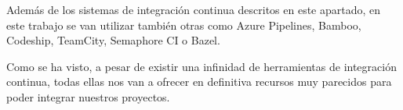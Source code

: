 

Además de los sistemas de integración continua descritos en este apartado, en este trabajo se van utilizar también otras como Azure Pipelines, Bamboo, Codeship, TeamCity, Semaphore CI o Bazel.

Como se ha visto, a pesar de existir una infinidad de herramientas de integración continua, todas ellas nos van a ofrecer en definitiva recursos muy parecidos para poder integrar nuestros proyectos.

